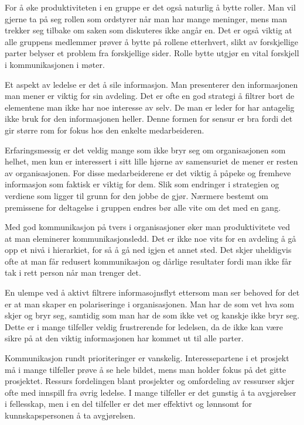 \documentclass[12pt, a4paper]{article}
\begin{document}
For å øke produktiviteten i en gruppe er det også naturlig å bytte roller. Man
vil gjerne ta på seg rollen som ordstyrer når man har mange meninger, mens man
trekker seg tilbake om saken som diskuteres ikke angår en. Det er også viktig
at alle gruppens medlemmer prøver å bytte på rollene etterhvert, slikt av
forskjellige parter belyser et problem fra forskjellige sider. Rolle bytte
utgjør en vital forskjell i kommunikasjonen i møter.   

Et aspekt av ledelse er det å sile informasjon. Man presenterer den
informasjonen man mener er viktig for sin avdeling. Det er ofte en god strategi
å filtrer bort de elementene man ikke har noe interesse av selv. De man er
leder for har antagelig ikke bruk for den informasjonen heller. Denne formen
for sensur er bra fordi det gir større rom for fokus hos den enkelte
medarbeideren.

Erfaringsmessig er det veldig mange som ikke bryr seg om organisasjonen som
helhet, men kun er interessert i sitt lille hjørne av samensuriet de mener er
resten av organisasjonen. For disse medarbeiderene er det viktig å påpeke og
fremheve informasjon som faktisk er viktig for dem. Slik som endringer i
strategien og verdiene som ligger til grunn for den jobbe de gjør. Nærmere
bestemt om premissene for deltagelse i gruppen endres bør alle vite om det med
en gang.

Med god kommunikasjon på tvers i organisasjoner øker man produktivitete ved at
man eleminerer kommunikasjonsledd. Det er ikke noe vits for en avdeling å gå
opp et nivå i hierarkiet, for så å gå ned igjen et annet sted. Det skjer
uheldigvis ofte at man får redusert kommunikasjon og dårlige resultater fordi
man ikke får tak i rett person når man trenger det.  

En ulempe ved å aktivt filtrere informasojnsflyt ettersom man ser behoved for
det er at man skaper en polariseringe i organisasjonen. Man har de som vet hva
som skjer og bryr seg, samtidig som man har de som ikke vet og kanskje ikke
bryr seg. Dette er i mange tilfeller veldig frustrerende for ledelsen, da de
ikke kan være sikre på at den viktig informasjonen har kommet ut til alle
parter.  

Kommunikasjon rundt prioriteringer er vanskelig. Interessepartene i et prosjekt
må i mange tilfeller prøve å se hele bildet, mens man holder fokus på det gitte
prosjektet. Ressurs fordelingen blant prosjekter og omfordeling av ressurser
skjer ofte med innspill fra øvrig ledelse. I mange tilfeller er det gunstig å
ta avgjørelser i fellesskap, men i en del tilfeller er det mer effektivt og
lønnsomt for kunnskapspersonen å ta avgjørelsen.  
\end{document}
